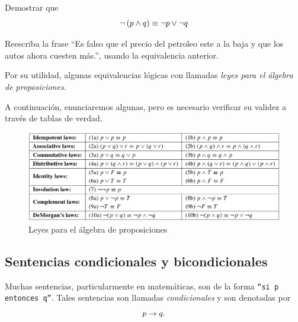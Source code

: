  \begin{resuelto} Demostrar que
  $$
  \neg\left( p \wedge q \right) \equiv \neg p \vee \neg q
  $$
 \end{resuelto}




 \begin{resuelto}
  Reescriba la frase ``Es falso que el precio del petroleo este a la baja y que los autos ahora cuesten más.'', usando la equivalencia anterior.
 \end{resuelto}





 Por su utilidad, algunas equivalencias lógicas con llamadas \emph{leyes para el álgebra de proposiciones.}


 A continuación, enunciaremos algunas, pero es necesario verificar su validez a través de tablas de verdad.



\begin{figure}
	\centering
	\includegraphics[width=\linewidth]{md/tabla_4-1}
 \caption{Leyes para el álgebra de proposiciones}
\label{fig:tabla:4.1}
\end{figure}



\subsection{Sentencias condicionales y bicondicionales}


 Muchas sentencias, particularmente en matemáticas, son de la forma \texttt{``si p entonces q''}.  Tales sentencias son llamadas \emph{condicionales} y son denotadas por
 $$
 p \rightarrow q.
 $$



